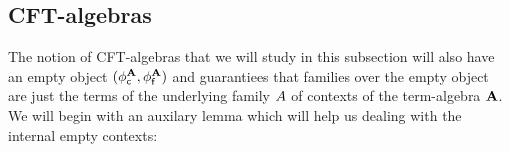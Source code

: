 \begin{comment}
\begin{rmk}
Before we continue, let us explore what it means to be an extension algebra
term of the extension algebra $\ctxwk{\mathcal{A}}{\mathcal{B}}$. Such an
extension algebra term $(x,y)$ would consist of
\begin{align*}
\jterm*{{\Gamma}{A}}{\ctxwk{A}{B}}{x}\\
\jterm*{{{\Gamma}{A}}{P}}{\subst{\jcomp{}{\epsilon_0}{x}}{\ctxwk{\ctxext{A}{P}}{Q}}}{y}.
\end{align*}
Thus, $x$ is a context morphism from $A$ to $B$ and $y$ is nothing but a term
of $\jcomp{}{\jcomp{}{\epsilon_0}{x}}{Q}$. For $x$, we see that the diagram
\begin{equation*}
\begin{tikzcd}
\ctxext{B}{Q} 
  \ar{r}{g} 
& B 
  \\
\ctxext{A}{P} 
  \ar{u}{\jvcomp{}{x}{y}}
  \ar{r}{e}
& A
  \ar{u}[swap]{x}
\end{tikzcd}
\end{equation*}
commutes.
\end{rmk}
\end{comment}

\subsection{CFT-algebras}
The notion of CFT-algebras that we will
study in this subsection will also have an empty object $(\phi_{\mathsf{c}}^{\mathbf{A}},
\phi_{\mathsf{f}}^{\mathbf{A}})$ and guarantiees that families over the empty object
are just the terms of the underlying family $\cftalgc{\cftalg{A}}$ of contexts
of the term-algebra $\mathbf{A}$. We will begin with an auxilary lemma which
will help us dealing with the internal empty contexts:

